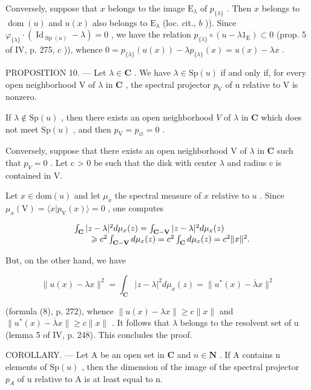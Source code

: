 Conversely, suppose that \(x\) belongs to the image \(\mathrm{E}_{\lambda}\) of \(p_{\{\lambda\}}\) . Then \(x\) belongs to \(\operatorname{dom}(u)\) and \(u(x)\) also belongs to \(\mathrm{E}_{\lambda}\) (loc. cit., \(b\) )). Since \(\varphi_{\{\lambda\}} \cdot (\operatorname{Id}_{\operatorname{Sp}(u)} - \lambda) = 0\) , we have the relation \(p_{\{\lambda\}} \circ (u - \lambda 1_{\mathrm{E}}) \subset 0\) (prop. 5 of IV, p. 275, \(c\) )), whence \(0 = p_{\{\lambda\}}(u(x)) - \lambda p_{\{\lambda\}}(x) = u(x) - \lambda x\) .

PROPOSITION 10. — Let \(\lambda \in \mathbf{C}\) . We have \(\lambda \in \mathrm{Sp}(u)\) if and only if, for every open neighborhood V of \(\lambda\) in \(\mathbf{C}\) , the spectral projector \(p_{\mathrm{V}}\) of u relative to V is nonzero.

If \(\lambda \notin \mathrm{Sp}(u)\) , then there exists an open neighborhood \(V\) of \(\lambda\) in \(\mathbf{C}\) which does not meet \(\mathrm{Sp}(u)\) , and then \(p_{\mathrm{V}} = p_{\varnothing} = 0\) .

Conversely, suppose that there exists an open neighborhood V of \(\lambda\) in \(\mathbf{C}\) such that \(p_{V} = 0\) . Let c > 0 be such that the disk with center \(\lambda\) and radius c is contained in V.

Let \(x \in \mathrm{dom}(u)\) and let \(\mu_x\) the spectral measure of \(x\) relative to \(u\) . Since \(\mu_x(\mathrm{V}) = \langle x | p_{\mathrm{V}}(x) \rangle = 0\) , one computes

\[
\begin{array}{r l} & {\int_ {\mathbf {C}} | z - \lambda | ^ {2} d \mu_ {x} (z) = \int_ {\mathbf {C - V}} | z - \lambda | ^ {2} d \mu_ {x} (z)} \\ & {\qquad \geqslant c ^ {2} \int_ {\mathbf {C - V}} d \mu_ {x} (z) = c ^ {2} \int_ {\mathbf {C}} d \mu_ {x} (z) = c ^ {2} \| x \| ^ {2}.} \end{array}
\]

But, on the other hand, we have

\[
\| u (x) - \lambda x \| ^ {2} = \int_ {\mathbf {C}} | z - \lambda | ^ {2} d \mu_ {x} (z) = \| u ^ {*} (x) - \overline {{\lambda}} x \| ^ {2}
\]

(formula (8), p. 272), whence \(\|u(x)-\lambda x\|\geqslant c\|x\|\) and \(\|u^{*}(x)-\overline{\lambda}x\|\geqslant c\|x\|\) . It follows that \(\lambda\) belongs to the resolvent set of u (lemma 5 of IV, p. 248). This concludes the proof.

COROLLARY. — Let A be an open set in \(\mathbf{C}\) and \(n \in \mathbf N\) . If A contains n elements of \(\mathrm{Sp}(u)\) , then the dimension of the image of the spectral projector \(p_{A}\) of u relative to A is at least equal to n.

